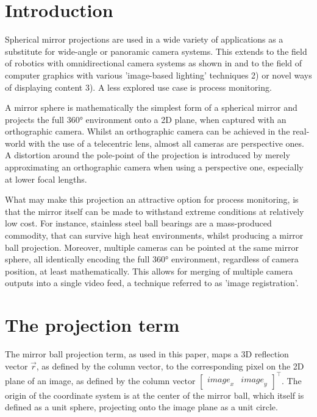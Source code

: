 \documentclass[10pt]{article}
\begin{document}
\begin{multicols}{2}
\section{Introduction}
Spherical mirror projections are used in a wide variety of applications as a substitute for wide-angle or panoramic camera systems. This extends to the field of robotics with omnidirectional camera systems as shown in \cite{omnidirectional} and to the field of computer graphics with various 'image-based lighting' techniques 2) or novel ways of displaying content 3). A less explored use case is process monitoring.

A mirror sphere is mathematically the simplest form of a spherical mirror and projects the full 360° environment onto a 2D plane, when captured with an orthographic camera. Whilst an orthographic camera can be achieved in the real-world with the use of a telecentric lens, almost all cameras are perspective ones. A distortion around the pole-point of the projection is introduced by merely approximating an orthographic camera when using a perspective one, especially at lower focal lengths.

What may make this projection an attractive option for process monitoring, is that the mirror itself can be made to withstand extreme conditions at relatively low cost. For instance, stainless steel ball bearings are a mass-produced commodity, that can survive high heat environments, whilst producing a mirror ball projection. Moreover, multiple cameras can be pointed at the same mirror sphere, all identically encoding the full 360° environment, regardless of camera position, at least mathematically. This allows for merging of multiple camera outputs into a single video feed, a technique referred to as 'image registration'.

\section{The projection term}
The mirror ball projection term, as used in this paper, maps a 3D reflection vector $\vec{r}$, as defined by the column vector, to the corresponding pixel on the 2D plane of an image, as defined by the column vector $\begin{bmatrix} {image}_x & {image}_y \end{bmatrix}^\intercal$. The origin of the coordinate system is at the center of the mirror ball, which itself is defined as a unit sphere, projecting onto the image plane as a unit circle. 


\end{multicols}
\end{document}
